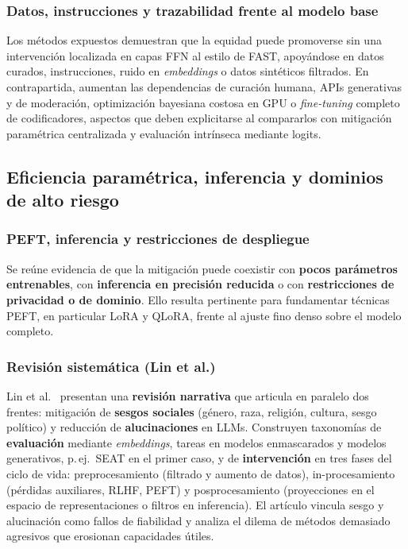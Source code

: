 \documentclass[12pt,a4paper]{report}
\begin{document}
\subsubsection{Datos, instrucciones y trazabilidad frente al modelo base}

Los métodos expuestos demuestran que la equidad puede promoverse sin una intervención localizada en capas FFN al estilo de FAST, apoyándose en datos curados, instrucciones, ruido en \textit{embeddings} o datos sintéticos filtrados. En contrapartida, aumentan las dependencias de curación humana, APIs generativas y de moderación, optimización bayesiana costosa en GPU o \textit{fine-tuning} completo de codificadores, aspectos que deben explicitarse al compararlos con mitigación paramétrica centralizada y evaluación intrínseca mediante logits.

\subsection{Eficiencia paramétrica, inferencia y dominios de alto riesgo}
\label{subsec:sintesis_eficiencia_inferencia}

\subsubsection{PEFT, inferencia y restricciones de despliegue}

Se reúne evidencia de que la mitigación puede coexistir con \textbf{pocos parámetros entrenables}, con \textbf{inferencia en precisión reducida} o con \textbf{restricciones de privacidad o de dominio}. Ello resulta pertinente para fundamentar técnicas PEFT, en particular LoRA y QLoRA, frente al ajuste fino denso sobre el modelo completo.

\subsubsection{Revisión sistemática (Lin et al.)}

Lin et al.\ \cite{lin_towards_2024} presentan una \textbf{revisión narrativa} que articula en paralelo dos frentes: mitigación de \textbf{sesgos sociales} (género, raza, religión, cultura, sesgo político) y reducción de \textbf{alucinaciones} en LLMs. Construyen taxonomías de \textbf{evaluación} mediante \textit{embeddings}, tareas en modelos enmascarados y modelos generativos, p.\,ej.\ SEAT en el primer caso, y de \textbf{intervención} en tres fases del ciclo de vida: preprocesamiento (filtrado y aumento de datos), in-procesamiento (pérdidas auxiliares, RLHF, PEFT) y posprocesamiento (proyecciones en el espacio de representaciones o filtros en inferencia). El artículo vincula sesgo y alucinación como fallos de fiabilidad y analiza el dilema de métodos demasiado agresivos que erosionan capacidades útiles.
\end{document}
